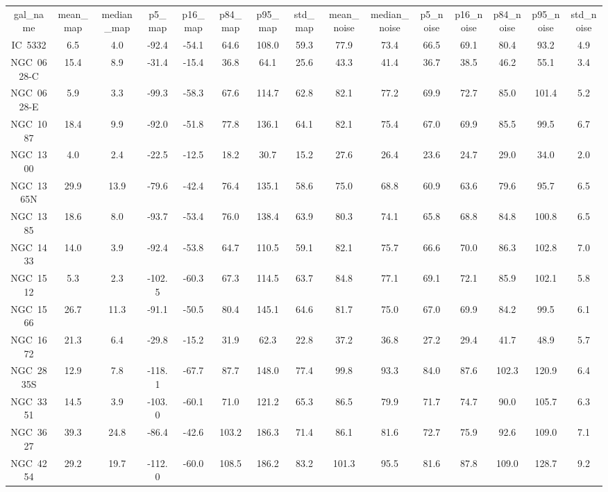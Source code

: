 \begin{table}
\begin{tabular}{ccccccccccccccc}
gal_name & mean_map & median_map & p5_map & p16_map & p84_map & p95_map & std_map & mean_noise & median_noise & p5_noise & p16_noise & p84_noise & p95_noise & std_noise \\
IC~5332 & 6.5 & 4.0 & -92.4 & -54.1 & 64.6 & 108.0 & 59.3 & 77.9 & 73.4 & 66.5 & 69.1 & 80.4 & 93.2 & 4.9 \\
NGC~0628-C & 15.4 & 8.9 & -31.4 & -15.4 & 36.8 & 64.1 & 25.6 & 43.3 & 41.4 & 36.7 & 38.5 & 46.2 & 55.1 & 3.4 \\
NGC~0628-E & 5.9 & 3.3 & -99.3 & -58.3 & 67.6 & 114.7 & 62.8 & 82.1 & 77.2 & 69.9 & 72.7 & 85.0 & 101.4 & 5.2 \\
NGC~1087 & 18.4 & 9.9 & -92.0 & -51.8 & 77.8 & 136.1 & 64.1 & 82.1 & 75.4 & 67.0 & 69.9 & 85.5 & 99.5 & 6.7 \\
NGC~1300 & 4.0 & 2.4 & -22.5 & -12.5 & 18.2 & 30.7 & 15.2 & 27.6 & 26.4 & 23.6 & 24.7 & 29.0 & 34.0 & 2.0 \\
NGC~1365N & 29.9 & 13.9 & -79.6 & -42.4 & 76.4 & 135.1 & 58.6 & 75.0 & 68.8 & 60.9 & 63.6 & 79.6 & 95.7 & 6.5 \\
NGC~1385 & 18.6 & 8.0 & -93.7 & -53.4 & 76.0 & 138.4 & 63.9 & 80.3 & 74.1 & 65.8 & 68.8 & 84.8 & 100.8 & 6.5 \\
NGC~1433 & 14.0 & 3.9 & -92.4 & -53.8 & 64.7 & 110.5 & 59.1 & 82.1 & 75.7 & 66.6 & 70.0 & 86.3 & 102.8 & 7.0 \\
NGC~1512 & 5.3 & 2.3 & -102.5 & -60.3 & 67.3 & 114.5 & 63.7 & 84.8 & 77.1 & 69.1 & 72.1 & 85.9 & 102.1 & 5.8 \\
NGC~1566 & 26.7 & 11.3 & -91.1 & -50.5 & 80.4 & 145.1 & 64.6 & 81.7 & 75.0 & 67.0 & 69.9 & 84.2 & 99.5 & 6.1 \\
NGC~1672 & 21.3 & 6.4 & -29.8 & -15.2 & 31.9 & 62.3 & 22.8 & 37.2 & 36.8 & 27.2 & 29.4 & 41.7 & 48.9 & 5.7 \\
NGC~2835S & 12.9 & 7.8 & -118.1 & -67.7 & 87.7 & 148.0 & 77.4 & 99.8 & 93.3 & 84.0 & 87.6 & 102.3 & 120.9 & 6.4 \\
NGC~3351 & 14.5 & 3.9 & -103.0 & -60.1 & 71.0 & 121.2 & 65.3 & 86.5 & 79.9 & 71.7 & 74.7 & 90.0 & 105.7 & 6.3 \\
NGC~3627 & 39.3 & 24.8 & -86.4 & -42.6 & 103.2 & 186.3 & 71.4 & 86.1 & 81.6 & 72.7 & 75.9 & 92.6 & 109.0 & 7.1 \\
NGC~4254 & 29.2 & 19.7 & -112.0 & -60.0 & 108.5 & 186.2 & 83.2 & 101.3 & 95.5 & 81.6 & 87.8 & 109.0 & 128.7 & 9.2 \\

\end{tabular}
\end{table}

